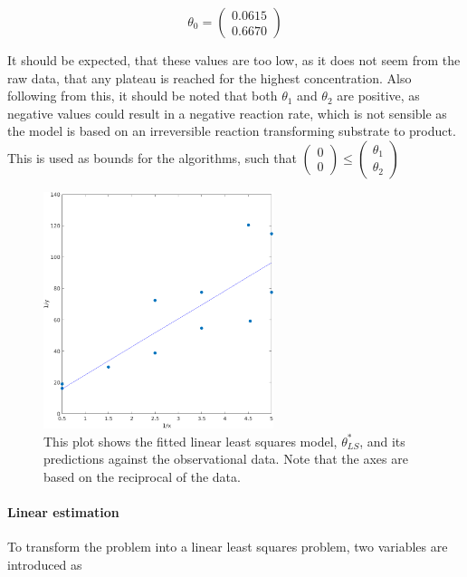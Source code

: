\begin{equation}
\theta_0 = \begin{pmatrix}
0.0615 \\ 0.6670
\end{pmatrix} \label{eq:init}
\end{equation}

It should be expected, that these values are too low, as it does not seem from the raw data, that any plateau is reached for the highest concentration. Also following from this, it should be noted that both $\theta_1$ and $\theta_2$ are positive, as negative values could result in a negative reaction rate, which is not sensible as the model is based on an irreversible reaction transforming substrate to product. This is used as bounds for the algorithms, such that $(\begin{smallmatrix} 0 \\ 0 \end{smallmatrix}) \leq (\begin{smallmatrix} \theta_1 \\ \theta_2 \end{smallmatrix})$


\begin{figure}[htb]
\centering
\includegraphics[width=0.6\textwidth]{../img/2-1reciprocal}
\caption{This plot shows the fitted linear least squares model, $\theta^{*}_{LS}$, and its predictions against the observational data. Note that the axes are based on the reciprocal of the data. }
\label{fig:2-1reciprocal}
\end{figure}

\paragraph{Linear estimation} To transform the problem into a linear least squares problem, two variables are introduced as



